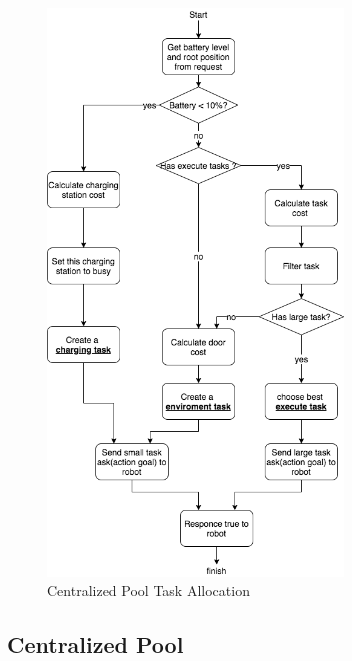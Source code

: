 \begin{figure}[htbp]
    \centering
    \includegraphics[width = 0.7\textwidth]{content/images/ch4/centralized_task_select.drawio.png}
    \caption{Centralized Pool Task Allocation}
    \label{fig:centralized_task_allocation}
\end{figure}
\subsection{Centralized Pool}

